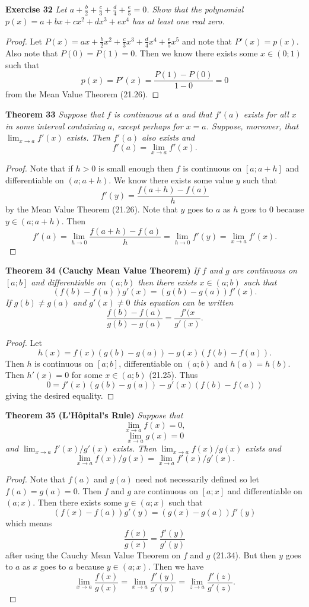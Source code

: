 \documentclass{article}
\begin{document}
\begin{flushleft}
\textbf{Exercise 32}
\textsl{Let $a + \frac{b}{2} + \frac{c}{3} + \frac{d}{4} + \frac{e}{5} = 0$. Show that the polynomial $p(x) = a + bx + cx^2 + dx^3 + ex^4$ has at least one real zero.}
\begin{proof}
Let $P(x) = ax + \frac{b}{2}x^2 + \frac{c}{3}x^3 + \frac{d}{4}x^4 + \frac{e}{5}x^5$ and note that $P'(x) = p(x)$. Also note that $P(0) = P(1) = 0$. Then we know there exists some $x \in (0;1)$ such that
\[
p(x) = P'(x) = \frac{P(1) - P(0)}{1-0} = 0
\]
from the Mean Value Theorem (21.26).
\end{proof}

\textbf{Theorem 33}
\textsl{Suppose that $f$ is continuous at $a$ and that $f'(a)$ exists for all $x$ in some interval containing $a$, except perhaps for $x = a$. Suppose, moreover, that $\lim_{x \rightarrow a} f'(x)$ exists. Then $f'(a)$ also exists and
\[
f'(a) = \lim_{x \rightarrow a} f'(x).
\]}
\begin{proof}
Note that if $h > 0$ is small enough then $f$ is continuous on $[a; a+h]$ and differentiable on $(a;a+h)$. We know there exists some value $y$ such that
\[
f'(y) = \frac{f(a+h) - f(a)}{h}
\]
by the Mean Value Theorem (21.26). Note that $y$ goes to $a$ as $h$ goes to $0$ because $y \in (a; a+h)$. Then
\[
f'(a) = \lim_{h \rightarrow 0} \frac{f(a+h) - f(a)}{h} = \lim_{h \rightarrow 0} f'(y) = \lim_{x \rightarrow a} f'(x).
\]
\end{proof}

\textbf{Theorem 34 (Cauchy Mean Value Theorem)}
\textsl{If $f$ and $g$ are continuous on $[a;b]$ and differentiable on $(a;b)$ then there exists $x \in (a;b)$ such that
\[
(f(b) - f(a)) g'(x) = (g(b) - g(a)) f'(x).
\]
If $g(b) \neq g(a)$ and $g'(x) \neq 0$ this equation can be written
\[
\frac{f(b)-f(a)}{g(b)-g(a)} = \frac{f'(x}{g'(x)}.
\]}
\begin{proof}
Let
\[
h(x) = f(x) (g(b)-g(a)) - g(x) (f(b)-f(a)).
\]
Then $h$ is continuous on $[a;b]$, differentiable on $(a;b)$ and $h(a) = h(b)$. Then $h'(x) = 0$ for some $x \in (a;b)$ (21.25). Thus
\[
0 = f'(x) (g(b)-g(a)) - g'(x) (f(b)-f(a))
\]
giving the desired equality.
\end{proof}

\textbf{Theorem 35 (L'H\^{o}pital's Rule)}
\textsl{Suppose that
\[
\lim_{x \rightarrow a} f(x) = 0,
\]
\[
\lim_{x \rightarrow a} g(x) = 0
\]
and $\lim_{x \rightarrow a} f'(x)/g'(x)$ exists. Then $\lim_{x \rightarrow a} f(x)/g(x)$ exists and
\[
\lim_{x \rightarrow a} f(x)/g(x) = \lim_{x \rightarrow a} f'(x)/g'(x).
\]}
\begin{proof}
Note that $f(a)$ and $g(a)$ need not necessarily defined so let $f(a) = g(a) = 0$. Then $f$ and $g$ are continuous on $[a;x]$ and differentiable on $(a;x)$. Then there exists some $y \in (a;x)$ such that
\[
(f(x) - f(a)) g'(y) = (g(x) - g(a)) f'(y)
\]
which means
\[
\frac{f(x)}{g(x)} = \frac{f'(y)}{g'(y)}
\]
after using the Cauchy Mean Value Theorem on $f$ and $g$ (21.34). But then $y$ goes to $a$ as $x$ goes to $a$ because $y \in (a;x)$. Then we have
\[
\lim_{x \rightarrow a} \frac{f(x)}{g(x)} = \lim_{x \rightarrow a} \frac{f'(y)}{g'(y)} = \lim_{z \rightarrow a} \frac{f'(z)}{g'(z)}.
\]
\end{proof}

\end{flushleft}
\end{document}
